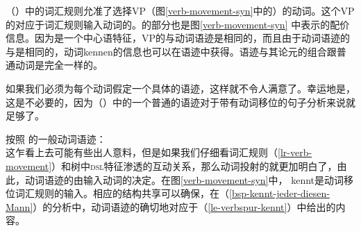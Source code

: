 \noindent
（）中的词汇规则允准了选择VP（图\ref{verb-movement-syn}中的）的动词。这个VP的\dslvc 对应于词汇规则输入动词的\locvc。\dslvc 的部分也是图\ref{verb-movement-syn} 中表示的配价信息。因为\dslc 是一个中心语特征，VP的\dslvc 与动词语迹是相同的，而且由于动词语迹的\locvc 与\dslvc 是相同的，动词kennen的\subcatc 信息也可以在语迹中获得。语迹与其论元的组合跟普通动词是完全一样的。

如果我们必须为每个动词假定一个具体的语迹，这样就不令人满意了。幸运地是，这是不必要的，因为（）中的一个普通的语迹对于带有动词移位的句子分析来说就足够了。

\eas
按照 的一般动词语迹：\\
\label{le-verbspur}
\zs
这乍看上去可能有些出人意料，但是如果我们仔细看词汇规则（\ref{lr-verb-movement}）和树中\textsc{dsl}特征渗透的互动关系，那么动词投射的\dslvc 就更加明白了，由此，动词语迹的\localvc 由输入动词的\localvc 决定。在图\ref{verb-movement-syn}中， kennt是动词移位词汇规则的输入。相应的结构共享可以确保，在（\ref{bsp-kennt-jeder-diesen-Mann}）的分析中，动词语迹的\localvc 确切地对应于（\ref{le-verbspur-kennt}）中给出的内容。

